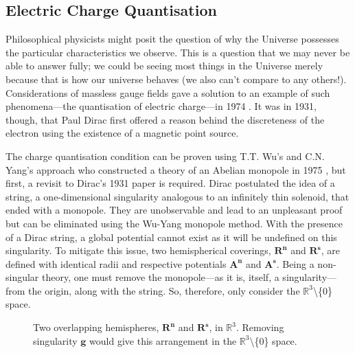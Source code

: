 \documentclass[fleqn, twocolumn, 10pt]{article}
\begin{document}

\subsection{Electric Charge Quantisation}

Philosophical physicists might posit the question of why the Universe possesses the particular characteristics we observe. This is a question that we may never be able to answer fully; we could be seeing most things in the Universe merely because that is how our universe behaves (we also can't compare to any others!). Considerations of massless gauge fields gave a solution to an example of such phenomena---the quantisation of electric charge---in 1974 \cite{georgi1974unity}. It was in 1931, though, that Paul Dirac first offered a reason behind the discreteness of the electron using the existence of a magnetic point source. 

The charge quantisation condition can be proven using T.T. Wu's and C.N. Yang's approach who constructed a theory of an Abelian monopole in 1975 \cite{WuMonopoleYang}, but first, a revisit to Dirac's 1931 paper is required. Dirac postulated the idea of a string, a one-dimensional singularity analogous to an infinitely thin solenoid, that ended with a monopole. They are unobservable and lead to an unpleasant proof but can be eliminated using the Wu-Yang monopole method. With the presence of a Dirac string, a global potential cannot exist as it will be undefined on this singularity. To mitigate this issue, two hemispherical coverings, $\mathbf{R^n}$ and $\mathbf{R^s}$, are defined with identical radii and respective potentials $\mathbf{A^n}$ and $\mathbf{A^s}$. Being a non-singular theory, one must remove the monopole---as it is, itself, a singularity---from the origin, along with the string. So, therefore, only consider the $\mathbb{R}^3$\textbackslash\{$0$\} space.\\

\begin{figure}[t]
\centering
{}
\caption{Two overlapping hemispheres, $\mathbf{R^n}$ and $\mathbf{R^s}$, in $\mathbb{R}^3$. Removing singularity $\bm{g}$ would give this arrangement in the $\mathbb{R}^3$\textbackslash \{$0$\} space.}
\end{figure}
\end{document}
